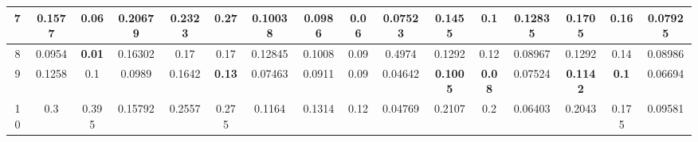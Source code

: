\begin{table}[htbp]
{\begin{tabular}{@{}cccccccccccccccc@{}}
    \multicolumn{1}{|c|}{7}      & \multicolumn{1}{c|}{0.1577}          & \multicolumn{1}{c|}{0.06}           & \multicolumn{1}{c||}{0.20679}          & \multicolumn{1}{c|}{0.2323}          & \multicolumn{1}{c|}{0.27}           & \multicolumn{1}{c||}{0.10038}          & \multicolumn{1}{c|}{0.0986}          & \multicolumn{1}{c|}{\textbf{0.06}} & \multicolumn{1}{c||}{0.07523}          & \multicolumn{1}{c||}{0.1455}          & \multicolumn{1}{c|}{0.1}            & \multicolumn{1}{c|}{0.12835}          & \multicolumn{1}{c|}{0.1705}          & \multicolumn{1}{c|}{0.16}          & \multicolumn{1}{c|}{0.07925}          \\ \midrule
    \multicolumn{1}{|c|}{8}      & \multicolumn{1}{c|}{0.0954}          & \multicolumn{1}{c|}{\textbf{0.01}}  & \multicolumn{1}{c||}{0.16302}          & \multicolumn{1}{c|}{0.17}            & \multicolumn{1}{c|}{0.17}           & \multicolumn{1}{c||}{0.12845}          & \multicolumn{1}{c|}{0.1008}          & \multicolumn{1}{c|}{0.09}          & \multicolumn{1}{c||}{0.4974}           & \multicolumn{1}{c||}{0.1292}          & \multicolumn{1}{c|}{0.12}           & \multicolumn{1}{c|}{0.08967}          & \multicolumn{1}{c|}{0.1292}          & \multicolumn{1}{c|}{0.14}          & \multicolumn{1}{c|}{0.08986}          \\ \midrule
    \multicolumn{1}{|c|}{9}      & \multicolumn{1}{c|}{0.1258}          & \multicolumn{1}{c|}{0.1}            & \multicolumn{1}{c||}{0.0989}           & \multicolumn{1}{c|}{0.1642}          & \multicolumn{1}{c|}{\textbf{0.13}}  & \multicolumn{1}{c||}{0.07463}          & \multicolumn{1}{c|}{0.0911}          & \multicolumn{1}{c|}{0.09}          & \multicolumn{1}{c||}{0.04642}          & \multicolumn{1}{c||}{\textbf{0.1005}} & \multicolumn{1}{c|}{\textbf{0.08}}  & \multicolumn{1}{c|}{0.07524}          & \multicolumn{1}{c|}{\textbf{0.1142}} & \multicolumn{1}{c|}{\textbf{0.1}}  & \multicolumn{1}{c|}{0.06694}          \\ \midrule
    \multicolumn{1}{|c|}{10}     & \multicolumn{1}{c|}{0.3}             & \multicolumn{1}{c|}{0.395}          & \multicolumn{1}{c||}{0.15792}          & \multicolumn{1}{c|}{0.2557}          & \multicolumn{1}{c|}{0.275}          & \multicolumn{1}{c||}{0.1164}           & \multicolumn{1}{c|}{0.1314}          & \multicolumn{1}{c|}{0.12}          & \multicolumn{1}{c||}{0.04769}          & \multicolumn{1}{c||}{0.2107}          & \multicolumn{1}{c|}{0.2}            & \multicolumn{1}{c|}{0.06403}          & \multicolumn{1}{c|}{0.2043}          & \multicolumn{1}{c|}{0.175}         & \multicolumn{1}{c|}{0.09581}          \\ \midrule

\end{tabular}}
\end{table}
